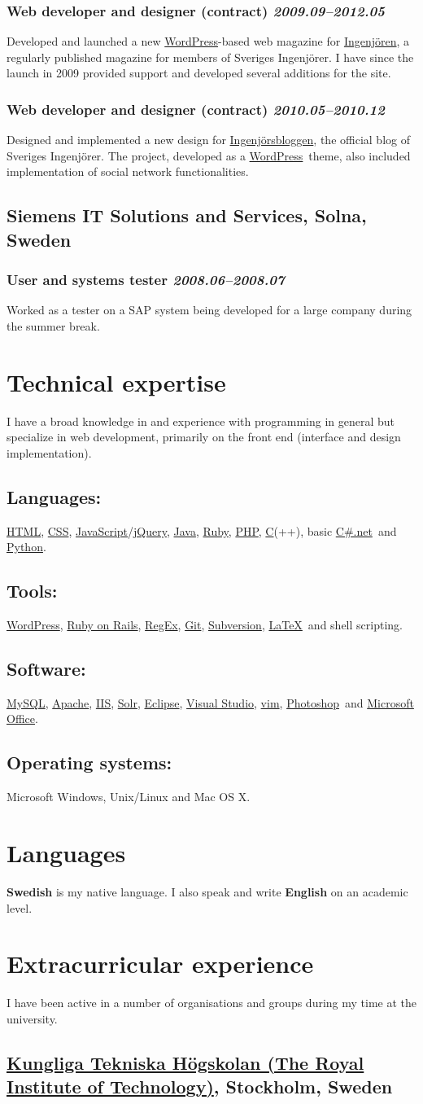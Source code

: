 \documentclass[a4paper,11pt]{article}
\newcommand{\icon}[1]{\textcolor{lightgray}{#1}}
\newcommand{\iconl}[1]{\hspace{-0.5cm}\makebox[0.3cm][c]{\icon{#1}}\hspace{0.2cm}}
\newcommand{\worktitle}[1]{\textbf{#1}}
\newcommand{\duration}[1]{\textsl{#1}}
\newcommand{\theplace}[2][]{\subsection*{\textbf{#2}#1}}
\newcommand{\thework}[2]{\subsubsection*{%
  \iconl{$\blacksquare$}%
  \worktitle{#1}%
  \hfill\duration{#2}}\par%
}
\newcommand{\thebold}[1]{\subsection*{\textbf{#1}}\vspace{-1mm}}
\def\html{\href{http://en.wikipedia.org/wiki/HTML}{HTML}}
\def\javascript{\href{http://en.wikipedia.org/wiki/JavaScript}{JavaScript}}
\def\css{\href{http://en.wikipedia.org/wiki/Cascading_Style_Sheets}{CSS}}
\def\clang{\href{http://en.wikipedia.org/wiki/C_\%28programming_language\%29}{C}}
\def\regex{\href{http://en.wikipedia.org/wiki/Regular_expressions}{RegEx}}
\def\git{\href{http://git-scm.com/}{Git}}
\def\svn{\href{http://subversion.apache.org/}{Subversion}}
\def\jquery{\href{http://jquery.com/}{jQuery}}
\def\wordpress{\href{http://wordpress.org}{WordPress}}
\def\ror{\href{http://rubyonrails.org}{Ruby on Rails}}
\def\java{\href{http://www.java.com/}{Java}}
\def\php{\href{http://php.net}{PHP}}
\def\ruby{\href{http://www.ruby-lang.org/}{Ruby}}
\def\csharp{\href{http://en.wikipedia.org/wiki/C_Sharp_\%28programming_language\%29}{C\#.net}}
\def\python{\href{http://www.python.org/}{Python}}
\def\mysql{\href{http://www.mysql.com/}{MySQL}}
\def\apache{\href{http://httpd.apache.org/}{Apache}}
\def\iis{\href{http://www.iis.net/}{IIS}}
\def\solr{\href{http://lucene.apache.org/solr/}{Solr}}
\def\eclipse{\href{http://www.eclipse.org/eclipse/}{Eclipse}}
\def\vs{\href{http://www.microsoft.com/visualstudio/}{Visual Studio}}
\def\vim{\href{http://www.vim.org/}{vim}}
\def\photoshop{\href{http://www.adobe.com/products/photoshop.html}{Photoshop}}
\def\office{\href{http://office.microsoft.com/}{Microsoft Office}}
\def\latex{\href{http://en.wikipedia.org/wiki/LaTeX}{LaTeX}}
\begin{document}
\thework{Web developer and designer (contract)}{2009.09--2012.05}
Developed and launched a new \wordpress-based web magazine for \href{http://www.ingenjoren.se}{Ingenjören}, a regularly published magazine for members of Sveriges Ingenjörer. I have since the launch in 2009 provided support and developed several additions for the site.

\thework{Web developer and designer (contract)}{2010.05--2010.12}
Designed and implemented a new design for \href{http://www.ingenjorsbloggen.se}{Ingenjörsbloggen}, the official blog of Sveriges Ingenjörer. The project, developed as a \wordpress\ theme, also included implementation of social network functionalities.

\theplace[, Solna, Sweden]{Siemens IT Solutions and Services}

\thework{User and systems tester}{2008.06--2008.07}
Worked as a tester on a SAP system being developed for a large company during the summer break.

\section*{Technical expertise}%
I have a broad knowledge in and experience with programming in general but specialize in web development, primarily on the front end (interface and design implementation).

\thebold{Languages:} \html, \css, \javascript/\jquery, \java, \ruby, \php, \clang(++), basic \csharp\ and \python.

\thebold{Tools:} \wordpress, \ror, \regex, \git, \svn, \latex\ and shell scripting.

\thebold{Software:} \mysql, \apache, \iis, \solr, \eclipse, \vs, \vim, \photoshop\ and \office.

\thebold{Operating systems:} Microsoft Windows, Unix/Linux and Mac OS X.
\section*{Languages}%
\textbf{Swedish} is my native language. I also speak and write \textbf{English} on an academic level.
\section*{Extracurricular  experience}%
I have been active in a number of organisations and groups during my time at the university.

\theplace[, Stockholm, Sweden]{\href{http://kth.se}{Kungliga Tekniska Högskolan (The Royal Institute of Technology)}}
\end{document}
